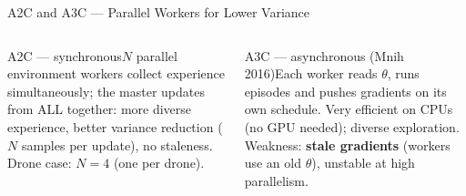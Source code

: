 \documentclass[aspectratio=169,10pt,t]{beamer}
\begin{document}
\begin{frame}{A2C and A3C --- Parallel Workers for Lower Variance}
\begin{columns}[T]
\begin{cbox}[ISSAgrn]{A2C --- synchronous}\scriptsize $N$ parallel environment workers collect experience simultaneously; the master updates from ALL together: more diverse experience, better variance reduction ($N$ samples per update), no staleness. Drone case: $N=4$ (one per drone).\end{cbox}
\begin{cbox}[ISSAamb]{A3C --- asynchronous (Mnih 2016)}\scriptsize Each worker reads $\theta$, runs episodes and pushes gradients on its own schedule. Very efficient on CPUs (no GPU needed); diverse exploration. Weakness: \textbf{stale gradients} (workers use an old $\theta$), unstable at high parallelism.\end{cbox}
\end{columns}
\end{frame}
\end{document}
